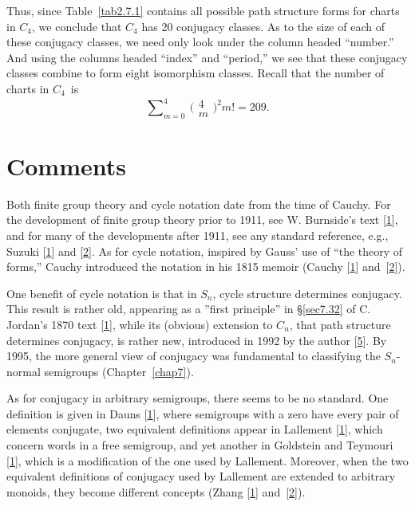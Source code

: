 \documentclass{surv-l}
\numberwithin{equation}{section}
\numberwithin{table}{section}
\numberwithin{figure}{section}
\theoremstyle{definition}
\begin{document}
Thus, since Table~\ref{tab2.7.1} contains all possible path
structure forms for charts in $C_{4}$, we conclude that $C_{4}$
has 20 conjugacy classes. As to the size of each of these
conjugacy classes, we need only
look under the column headed ``number.'' And using the columns
headed ``index'' and ``period,'' we see that these conjugacy
classes combine to form eight isomorphism classes. Recall that the
number of charts in $C_{4}$~is
\[
\sum\nolimits_{m=0}^{4}\ \big(\!\begin{smallmatrix}
4\\
m
\end{smallmatrix}\!\big)^2 m!=209.
\]

\section{Comments}\label{sec2.8}

Both finite group theory and cycle notation date from the time of
Cauchy. For the development of finite group
theory prior to 1911, see W. Burnside's text
[\hyperlink{bib6}{1}], and for many of the developments
after 1911, see any standard reference, e.g., Suzuki [\hyperlink{bib74}{1}] and
[\hyperlink{bib74a}{2}]. As for cycle notation, inspired
by Gauss' use of ``the theory of forms,''
Cauchy introduced the notation in his 1815 memoir (Cauchy
[\hyperlink{bib7}{1}]
and~[\hyperlink{bib7a}{2}]).

One benefit of cycle notation is that in $S_{n}$, cycle structure
determines conjugacy. This result is rather old, appearing as a
''first principle'' in \S\ref{sec7.32} of C.
Jordan's 1870 text
[\hyperlink{bib34}{1}], while its (obvious) extension to
$C_{n}$, that path structure determines
conjugacy, is rather new, introduced in 1992 by the author
[\hyperlink{bib43d}{5}]. By 1995, the more general view
of conjugacy was fundamental to classifying the $S_{n}$-normal
semigroups (Chapter~\ref{chap7}).

As for conjugacy in arbitrary semigroups, there seems to be no
standard. One definition is given in Dauns
[\hyperlink{bib10}{1}], where semigroups with a zero have
every pair of elements conjugate, two equivalent definitions
appear in Lallement [\hyperlink{bib38}{1}], which concern words in
a free semigroup, and yet another in Goldstein and Teymouri
[\hyperlink{bib21}{1}], which is a modification of the
one used by Lallement. Moreover, when the two equivalent
definitions of conjugacy used by Lallement are extended to
arbitrary monoids, they become different concepts
(Zhang [\hyperlink{bib80}{1}]
and~[\hyperlink{bib80a}{2}]).
\end{document}
